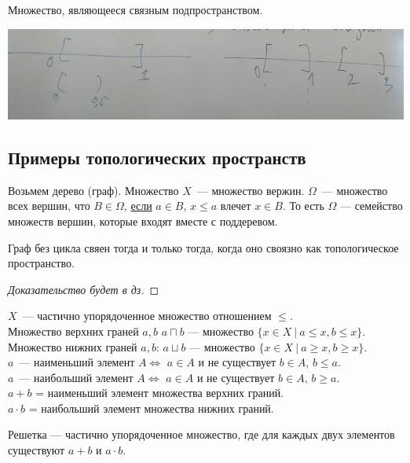 \begin{definition}

    Множество, являющееся связным подпространством.
\end{definition}

\begin{center}
    \includegraphics[scale=0.6]{img/topology_connectivy}
\end{center}

\subsection{Примеры топологических пространств}
Возьмем дерево (граф). Множество $X$~--- множество вержин. $\Omega$~--- множество всех вершин, что
$B \in \Omega$, \underline{если} $a \in B$, $x \leqslant a$ влечет $x \in B$.
То есть $\Omega$ --- семейство множеств вершин, которые входят вместе с поддеревом.

\begin{theorem}
    Граф без цикла свяен тогда и только тогда, когда оно своязно как топологическое пространство.
\end{theorem}
\begin{proof}[Доказательство будет в дз]
\end{proof}

\begin{definition}[Решетки]
    $X$~--- частично упорядоченное множество отношением $\leqslant$.\\
    Множество верхних граней $a, b$ $a \sqcap b$ --- множество $\{ x \in X ~|~ a \leqslant x, b \leqslant x\}$.\\
    Множество нижних граней $a, b$: $a \sqcup b$ --- множество $\{ x \in X ~|~ a \geqslant x, b \geqslant x\}$.\\
    $a$~--- наименьший элемент $A \iff$ $a \in A$ и не существует $b \in A$, $b \leqslant a$.\\
    $a$~--- наибольший элемент $A \iff$ $a \in A$ и не существует $b \in A$, $b \geqslant a$.\\
    $a+b$ = наименьший элемент множества верхних граний.\\
    $a \cdot b$ = наибольший элемент множества нижних граний.

    Решетка --- частично упорядоченное множество, где для каждых двух элементов существуют $a+b$ и $a \cdot b$.
\end{definition}


